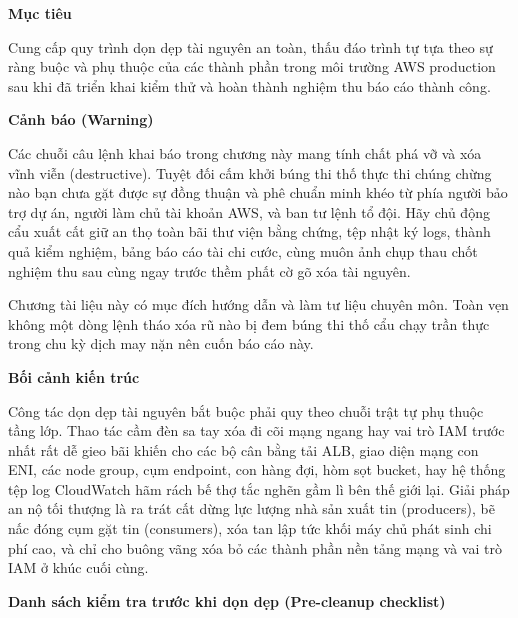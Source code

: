 \vspace{0.5em}\noindent\textbf{Mục tiêu}\par

Cung cấp quy trình dọn dẹp tài nguyên an toàn, thấu đáo trình tự tựa
theo sự ràng buộc và phụ thuộc của các thành phần trong môi trường AWS
production sau khi đã triển khai kiểm thử và hoàn thành nghiệm thu báo
cáo thành công.

\vspace{0.5em}\noindent\textbf{Cảnh báo (Warning)}\par

Các chuỗi câu lệnh khai báo trong chương này mang tính chất phá vỡ và
xóa vĩnh viễn (destructive). Tuyệt đối cấm khởi búng thi thố thực thi
chúng chừng nào bạn chưa gặt được sự đồng thuận và phê chuẩn minh khéo
từ phía người bảo trợ dự án, người làm chủ tài khoản AWS, và ban tư lệnh
tổ đội. Hãy chủ động cẩu xuất cất giữ an thọ toàn bãi thư viện bằng
chứng, tệp nhật ký logs, thành quả kiểm nghiệm, bảng báo cáo tài chi
cước, cùng muôn ảnh chụp thau chốt nghiệm thu sau cùng ngay trước thềm
phất cờ gõ xóa tài nguyên.

Chương tài liệu này có mục đích hướng dẫn và làm tư liệu chuyên môn.
Toàn vẹn không một dòng lệnh tháo xóa rũ nào bị đem búng thi thố cẩu
chạy trần thực trong chu kỳ dịch may nặn nên cuốn báo cáo này.

\vspace{0.5em}\noindent\textbf{Bối cảnh kiến
trúc}\par

Công tác dọn dẹp tài nguyên bắt buộc phải quy theo chuỗi trật tự phụ
thuộc tầng lớp. Thao tác cầm đèn sa tay xóa đi cõi mạng ngang hay vai
trò IAM trước nhất rất dễ gieo bãi khiến cho các bộ cân bằng tải ALB,
giao diện mạng con ENI, các node group, cụm endpoint, con hàng đợi, hòm
sọt bucket, hay hệ thống tệp log CloudWatch hãm rách bế thợ tắc nghẽn
gầm lì bên thế giới lại. Giải pháp an nộ tối thượng là ra trát cất dừng
lực lượng nhà sản xuất tin (producers), bẽ nấc đóng cụm gặt tin
(consumers), xóa tan lập tức khối máy chủ phát sinh chi phí cao, và chỉ
cho buông vãng xóa bỏ các thành phần nền tảng mạng và vai trò IAM ở khúc
cuối cùng.

\vspace{0.5em}\noindent\textbf{Danh sách kiểm tra trước khi dọn dẹp (Pre-cleanup
checklist)}\par

